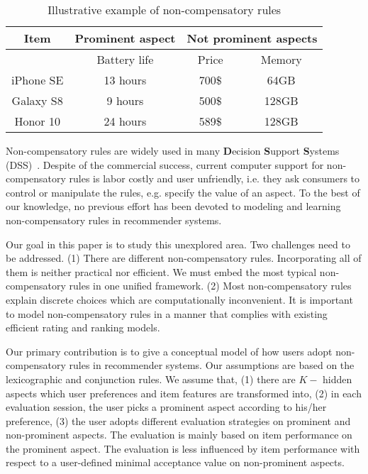 \documentclass[letterpaper]{article} %
\begin{document}
\begin{table}[htp]\label{tab:rules}
\caption{Illustrative example of non-compensatory rules}
\begin{center}
\begin{tabular}{|c|c|c|c|}
\hline
Item & Prominent aspect & \multicolumn{2}{|c|}{Not prominent aspects}\\\hline
& Battery life &  Price & Memory \\\hline
iPhone SE &  13 hours & 700$\$$ & 64GB  \\\hline
Galaxy S8 & 9 hours& 500$\$$  & 128GB \\\hline
Honor 10 & 24 hours& 589$\$$ & 128GB \\\hline
\end{tabular}
\end{center}
\label{default}
\end{table}%

Non-compensatory rules are widely used in many \textbf{D}ecision \textbf{S}upport \textbf{S}ystems (DSS)~\cite{Lee2009Transforming}. Despite of the commercial success, current computer support for non-compensatory rules is labor costly and user unfriendly, i.e. they ask consumers to control or manipulate the rules, e.g. specify the value of an aspect. To the best of our knowledge, no previous effort has been devoted to modeling and learning non-compensatory rules in recommender systems. 

Our goal in this paper is to study this unexplored area. Two challenges need to be addressed. (1) There are different non-compensatory rules. Incorporating all of them is neither practical nor efficient. We must embed the most typical non-compensatory rules in one unified framework. (2) Most non-compensatory rules explain discrete choices which are computationally inconvenient. It is important to model non-compensatory rules in a manner that complies with existing  efficient rating and ranking models.  

Our primary contribution is to give a conceptual model of how users adopt non-compensatory rules in recommender systems. Our assumptions are based on the lexicographic and conjunction rules. We assume that, (1) there are $K-$ hidden aspects which  user preferences and item features are transformed into, (2) in each evaluation session, the user picks a prominent aspect according to his/her preference, (3) the user adopts different evaluation strategies on prominent and non-prominent aspects. The evaluation is mainly based on item performance on the prominent aspect. The evaluation is less influenced by item performance with respect to a user-defined minimal acceptance value on non-prominent aspects.
\end{document}
